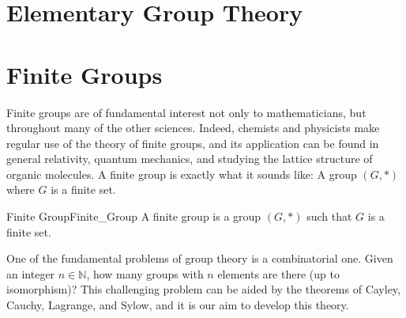 \begingroup
    \ifcsname\PATH\endcsname
        \newcommand{\PATH}{books/Algebra/Group_Theory}
        \newcommand{\OLDPATH}{\PATH}
    \else
        \newcommand{\OLDPATH}{\PATH}
        \renewcommand{\PATH}{books/Algebra/Group_Theory}
    \fi
    \chapter{Elementary Group Theory}
        
        
        
        
    \chapter{Finite Groups}
        Finite groups are of fundamental interest not only to mathematicians,
        but throughout many of the other sciences. Indeed, chemists and
        physicists make regular use of the theory of finite groups, and its
        application can be found in general relativity, quantum mechanics, and
        studying the lattice structure of organic molecules. A finite group is
        exactly what it sounds like: A group $(G,*)$ where $G$ is a finite set.
        \begin{fdefinition}{Finite Group}{Finite_Group}
            A finite group is a \gls{group} $(G,*)$ such that $G$ is a
            finite set.
        \end{fdefinition}
        One of the fundamental problems of group theory is a combinatorial one.
        Given an integer $n\in\mathbb{N}$, how many groups with $n$ elements are
        there (up to isomorphism)? This challenging problem can be aided by the
        theorems of Cayley, Cauchy, Lagrange, and Sylow, and it is our aim to
        develop this theory.
        
    \renewcommand{\PATH}{\OLDPATH}
\endgroup